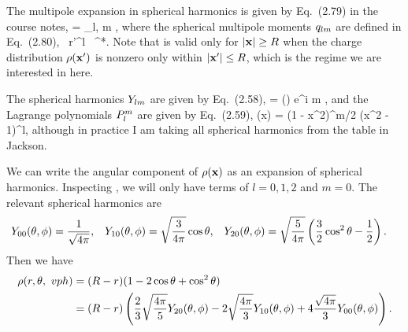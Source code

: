 \begin{solution}
	The multipole expansion in spherical harmonics is given by Eq.~(2.79) in the course notes,
	\beqn \label{multipole}
		\phix = \sum_{l, m}   \Ylmtv,
	\eeqn
	where the spherical multipole moments $q_{l m}$ are defined in Eq.~(2.80),
	\beq
		\qlm \equiv \int \rhoxp \, {r'}^l \, \Ylm^*\tvp \dcxp.
	\eeq
	Note that  is valid only for $\abs{\mathbf{x}} \geq R$ when the charge distribution $\rho(\mathbf{x}')$ is nonzero only within $\abs{\mathbf{x}'} \leq R$, which is the regime we are interested in here.
	
	The spherical harmonics $Y_{l m}$ are given by Eq.~(2.58),
	\beq
		\Ylmtv =   \Plm(\cost) e^{i m \vph},
	\eeq
	and the Lagrange polynomials $P_l^m$ are given by Eq.~(2.59),
	\beq
		\Plm(x) =  (1 - x^2)^{m/2}  (x^2 - 1)^l,
	\eeq
	although in practice I am taking all spherical harmonics from the table in Jackson.  
	
	We can write the angular component of $\rho(\mathbf{x})$ as an expansion of spherical harmonics.  Inspecting , we will only have terms of $l = 0, 1, 2$ and $m = 0$.  The relevant spherical harmonics are
	\begin{align*}
		Y_{0 0}(\theta, \phi) &= \frac{1}{\sqrt{4 \pi}}, &
		Y_{1 0}(\theta, \phi) &= \sqrt{\frac{3}{4\pi}} \cos\theta, &
		Y_{2 0}(\theta, \phi) &= \sqrt{\frac{5}{4\pi}} \left( \frac{3}{2} \cos^2\theta - \frac{1}{2} \right).
	\end{align*}
	Then we have
	\begin{align*}
		\rho(r, \theta,\ vph) &= (R - r) (1 - 2 \cos\theta + \cos^2\theta) \\
		&= (R - r) \left( \frac{2}{3} \sqrt{\frac{4\pi}{5}} Y_{2 0}(\theta, \phi) - 2 \sqrt{\frac{4\pi}{3}} Y_{1 0}(\theta, \phi) + 4 \frac{\sqrt{4\pi}}{3} Y_{0 0}(\theta, \phi) \right).
	\end{align*}
	

\end{solution}
